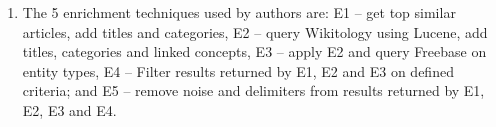 \documentclass[12pt]{article}
\begin{document}
\begin{enumerate}
	\item The 5 enrichment techniques used by authors are: E1 – get top similar articles, add titles and categories, E2 – query Wikitology using Lucene, add titles, categories and linked concepts, E3 – apply E2 and query Freebase on entity types, E4 – Filter results returned by E1, E2 and E3 on defined criteria; and E5 – remove noise and delimiters from results returned by E1, E2, E3 and E4. 
	
\end{enumerate}
\end{document}
